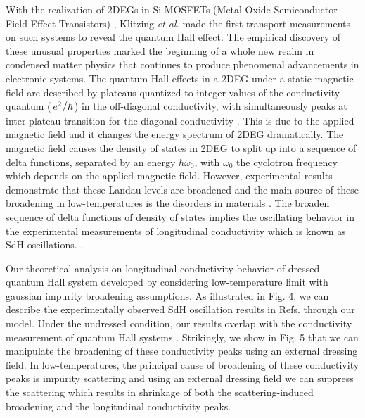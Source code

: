 \documentclass{article}
\begin{document}
\begin{itemize}
{  With the realization of 2DEGs in Si-MOSFETs (Metal Oxide Semiconductor Field Effect Transistors) \citep{fowler66}, Klitzing \textit{et al.} \cite{klitzing80} made the first transport measurements on such systems to reveal the quantum Hall effect. The empirical discovery of these unusual properties marked the beginning of a whole new realm in condensed matter physics that continues to produce phenomenal advancements in electronic systems. The quantum Hall effects in a 2DEG under a static magnetic field are described by plateaus quantized to integer values of the conductivity quantum ($\flatfrac{e^2}{\hbar}$) in the off-diagonal conductivity, with simultaneously peaks at inter-plateau transition for the diagonal conductivity \cite{endo09}. This is due to the applied magnetic field and it changes the energy spectrum of 2DEG dramatically. The magnetic field causes the density of states in 2DEG to split up into a sequence of delta functions, separated by an energy $\hbar\omega_0$, with $\omega_0$ the cyclotron frequency which depends on the applied magnetic field.
  However, experimental results demonstrate that these Landau levels are broadened and the main source of these broadening in low-temperatures is the disorders in materials \cite{ando85,dial07}. The broaden sequence of delta functions of density of states implies the oscillating behavior in the experimental measurements of longitudinal conductivity which is known as SdH oscillations. \cite{endo09,wakabayashi78}.

  Our theoretical analysis on longitudinal conductivity behavior of dressed quantum Hall system developed by considering low-temperature limit with gaussian impurity broadening assumptions.
  As illustrated in Fig. 4, we can describe the experimentally observed SdH oscillation results in Refs.\cite{endo09,wakabayashi78} through our model.
  Under the undressed condition, our results overlap with the conductivity measurement of quantum Hall systems \cite{endo09}. Strikingly, we show in Fig. 5 that we can manipulate the broadening of these conductivity peaks using an external dressing field. In low-temperatures, the principal cause of broadening of these conductivity peaks is impurity scattering and using an external dressing field we can suppress the scattering which results in shrinkage of both the scattering-induced broadening and the longitudinal conductivity peaks.

}
\end{itemize}
\end{document}

